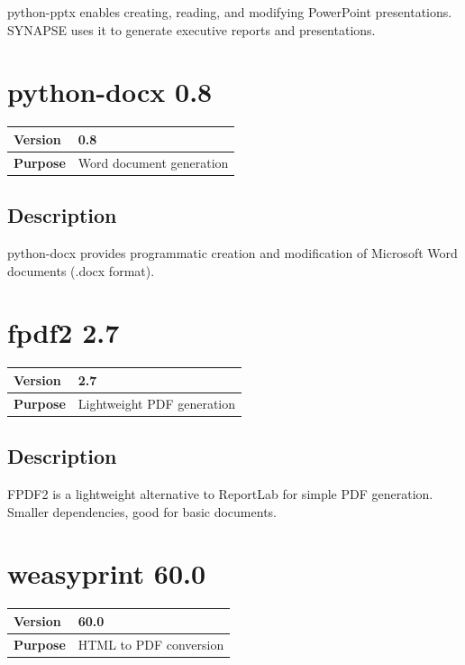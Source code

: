 \documentclass[12pt,a4paper]{report}
\begin{document}
python-pptx enables creating, reading, and modifying PowerPoint presentations. SYNAPSE uses it to generate executive reports and presentations.

\section{python-docx 0.8}

\begin{tabular}{|p{4cm}|p{10cm}|}
\hline
\textbf{Version} & 0.8 \\
\hline
\textbf{Purpose} & Word document generation \\
\hline
\end{tabular}

\subsection{Description}

python-docx provides programmatic creation and modification of Microsoft Word documents (.docx format).

\section{fpdf2 2.7}

\begin{tabular}{|p{4cm}|p{10cm}|}
\hline
\textbf{Version} & 2.7 \\
\hline
\textbf{Purpose} & Lightweight PDF generation \\
\hline
\end{tabular}

\subsection{Description}

FPDF2 is a lightweight alternative to ReportLab for simple PDF generation. Smaller dependencies, good for basic documents.

\section{weasyprint 60.0}

\begin{tabular}{|p{4cm}|p{10cm}|}
\hline
\textbf{Version} & 60.0 \\
\hline
\textbf{Purpose} & HTML to PDF conversion \\
\hline
\end{tabular}
\end{document}
